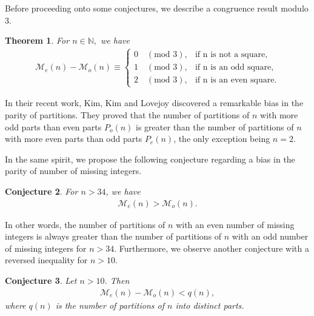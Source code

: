 \documentclass[12pt,reqno]{amsart}
\renewcommand{\(}{\left\(}
\renewcommand{\)}{\right\)}
\renewcommand{\[}{\left\[}
\renewcommand{\]}{\right\]}
\numberwithin{equation}{section}
\theoremstyle{plain}
\newtheorem{theorem}{Theorem}[section]
\newtheorem{conjecture}[theorem]{Conjecture}
\begin{document}
Before proceeding onto some conjectures, we describe a congruence result modulo $3$.
 \begin{theorem}\label{P_1(n,m)(w=-1)GFN}
 For $n\in\mathbb{N},$ we have
\begin{align*}
\mathcal{M}_e(n)-\mathcal{M}_o(n)\equiv
    \begin{cases}
            0 \quad(\text{mod 3}), &         \text{if n is not a square},\\
            1\quad(\text{mod 3}), &         \text{if n is an odd square},\\
            2\quad(\text{mod 3}), &         \text{if n is an even square.}
    \end{cases}
\end{align*}
\end{theorem}
 In their recent work, Kim, Kim and Lovejoy \cite{KKLparitybias} discovered a remarkable bias in the parity of partitions. They proved that the number of partitions of $n$ with more odd parts than even parts $P_o(n)$ is greater than the number of partitions of $n$ with more even parts than odd parts $P_e(n)$, the only exception being $n=2$.

In the same spirit, we propose the following conjecture regarding a bias in the parity of number of missing integers.
\begin{conjecture} For $n>34$, we have
\begin{align*}
\mathcal{M}_e(n)>\mathcal{M}_o(n).
\end{align*}
\end{conjecture}
In other words, the number of partitions of $n$ with an even number of missing integers is always greater than the number of partitions of $n$ with an odd number of missing integers for $n>34$. Furthermore, we observe another conjecture with a reversed inequality for $n > 10$.
\begin{conjecture} Let $n>10$. Then 
\begin{align*}
\mathcal{M}_e(n)-\mathcal{M}_o(n)<q(n),
\end{align*} 
where $q(n)$ is the number of partitions of $n$ into distinct parts.
\end{conjecture}
\end{document}
